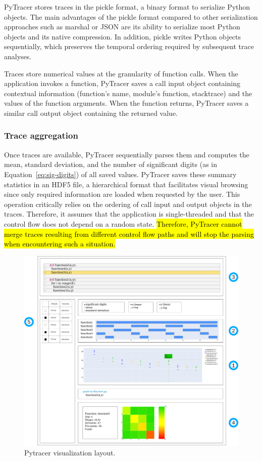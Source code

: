 \documentclass[10pt,journal,compsoc]{IEEEtran}
\newcommand{\pytracer}[0]{PyTracer\xspace}
\DeclareRobustCommand{\add}[1]{\sethlcolor{lightgreen}\hl{#1}}
\DeclareRobustCommand{\add}[1]{#1}
\begin{document}
\pytracer stores traces in the pickle format, a binary format to serialize
Python objects. The main advantages of the pickle format compared to other
serialization approaches such as marshal or JSON are its ability to serialize
most Python objects and its native compression.  In addition, pickle writes
Python objects sequentially, which preserves the temporal ordering required by
subsequent trace analyses.

Traces store numerical values at the granularity of function calls. When the
application invokes a function, \pytracer saves a call input object containing
contextual information (function's name, module's function, stacktrace) and the
values of the function arguments. When the function returns, \pytracer saves a
similar call output object containing the returned value. 


\subsubsection{Trace aggregation}

Once traces are available, \pytracer sequentially parses them and computes the
mean, standard deviation, and the number of significant digits (as in
Equation~\ref{eq:sig-digits}) of all saved values. \pytracer saves these summary
statistics in an HDF5 file, a hierarchical format that facilitates visual
browsing since only required information are loaded when requested by the user.
This operation critically relies on the ordering of call input and output
objects in the traces. Therefore, it assumes that the application is
single-threaded and that the control flow does not depend on a random state.
\add{Therefore, \mbox{\pytracer} cannot merge traces resulting from different
    control flow paths and will stop the parsing when encountering such a situation.}

\begin{figure}
    \centering
    \includegraphics[width=0.75\linewidth]{figure/pytracer_layout.pdf}
    \caption{Pytracer visualization layout.}
    \label{fig:visu-layout}
\end{figure}
\end{document}
